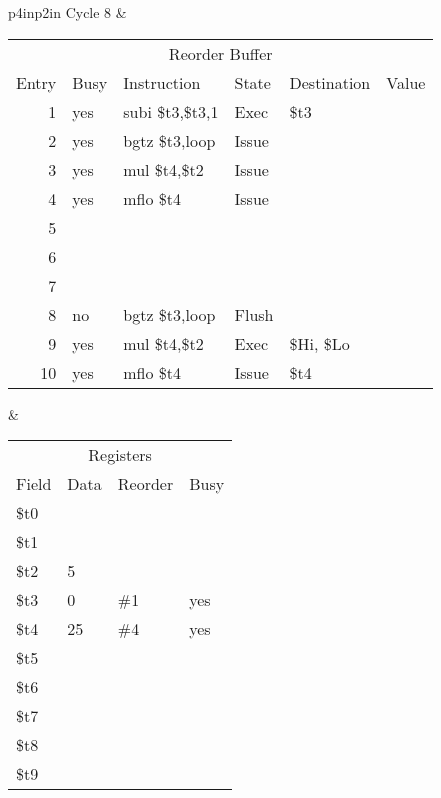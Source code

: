 \noindent
\begin{tabular}{p{4in}p{2in}}
Cycle 8 & \\ \hline \hline

\begin{tabular}{rlp{.9in}lll}
\multicolumn{6}{c}{Reorder Buffer} \\
Entry & Busy & Instruction        & State & Destination & Value \\ \hline
 1    & yes  & subi \$t3,\$t3,1   & Exec  & \$t3        &       \\
 2    & yes  & bgtz \$t3,loop     & Issue &             &       \\
 3    & yes  & mul  \$t4,\$t2     & Issue &             &       \\
 4    & yes  & mflo \$t4          & Issue &             &       \\
 5    &      &                    &       &             &       \\
 6    &      &                    &       &             &       \\
 7    &      &                    &       &             &       \\
 8    & no   & bgtz \$t3,loop     & Flush &             &       \\
 9    & yes  & mul  \$t4,\$t2     & Exec  & \$Hi, \$Lo  &       \\
10    & yes  & mflo \$t4          & Issue & \$t4        &       \\
\end{tabular} &

\begin{tabular}{llll}
\multicolumn{4}{c}{Registers} \\
Field & Data & Reorder & Busy \\ \hline
\$t0  &      &         &      \\
\$t1  &      &         &      \\
\$t2  & 5    &         &      \\
\$t3  & 0    & \#1     & yes  \\
\$t4  & 25   & \#4     & yes  \\
\$t5  &      &         &      \\
\$t6  &      &         &      \\
\$t7  &      &         &      \\
\$t8  &      &         &      \\
\$t9  &      &         &      \\
\end{tabular} \\


\end{tabular}
